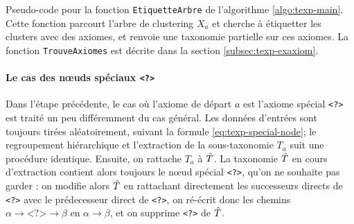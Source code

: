 \begin{algorithm}

\caption{Pseudo-code pour la fonction \texttt{EtiquetteArbre} de l'algorithme \ref{algo:texp-main}. Cette fonction parcourt l'arbre de clustering $X_a$ et cherche à étiquetter les clusters avec des axiomes, et renvoie une taxonomie partielle sur ces axiomes. La fonction \texttt{TrouveAxiomes} est décrite dans la section \ref{subsec:texp-exaxiom}.}
\label{algo:texp-trouve}
\end{algorithm}

\paragraph{Le cas des nœuds spéciaux \texttt{<?>}} Dans l'étape précédente, le cas où l'axiome de départ $a$ est l'axiome spécial \texttt{<?>} est traité un peu différemment du cas général. Les données d'entrées sont toujours tirées aléatoirement, suivant la formule \ref{eq:texp-special-node}; le regroupement hiérarchique et l'extraction de la sous-taxonomie $T_a$ suit une procédure identique. Ensuite, on rattache $T_a$ à $\hat{T}$. La taxonomie $\hat{T}$ en cours d'extraction contient alors toujours le nœud spécial \texttt{<?>}, qu'on ne souhaite pas garder : on modifie alors $\hat{T}$ en rattachant directement les successeurs directs de \texttt{<?>} avec le prédecesseur direct de \texttt{<?>}, on ré-écrit donc les chemins $\alpha \rightarrow \texttt{<?>} \rightarrow \beta$ en $\alpha \rightarrow \beta$, et on supprime \texttt{<?>} de $\hat{T}$.

